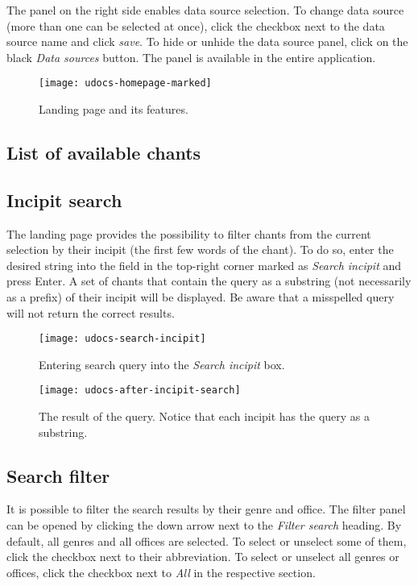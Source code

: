 The panel on the right side enables data source selection. To change data source (more than one can be selected at once), click the checkbox next
to the data source name and click \emph{save}. To hide or unhide the data source panel, click on the black \emph{Data sources} button. The panel
is available in the entire application.

\begin{figure}[!h]
\centering
\texttt{[image: udocs-homepage-marked]}
\caption{Landing page and its features.}
\label{fig:land_page}
\end{figure}


\subsection{List of available chants}

\subsection{Incipit search}

The landing page provides the possibility to filter chants from the current selection by their incipit (the first few words of the chant). To do so, enter the desired string into
the field in the top-right corner marked as \emph{Search incipit} and press Enter. A set of chants that contain the query as a substring (not necessarily as a prefix)
of their incipit will be displayed. Be aware that a misspelled query will not return the correct results.

\begin{figure}[!h]
\centering
\texttt{[image: udocs-search-incipit]}
\caption{Entering search query into the \emph{Search incipit} box.}
\label{fig:inc-search}
\end{figure}

\begin{figure}[!h]
\centering
\texttt{[image: udocs-after-incipit-search]}
\caption{The result of the query. Notice that each incipit has the query as a substring.}
\label{fig:inc-search-result}
\end{figure}

\subsection{Search filter}

It is possible to filter the search results by their genre and office. The filter panel can be opened by clicking the down arrow next to the \emph{Filter search}
heading. By default, all genres and all offices are selected. To select or unselect some of them, click the checkbox next to their abbreviation. To select 
or unselect all genres or offices, click the checkbox next to \emph{All} in the respective section.

